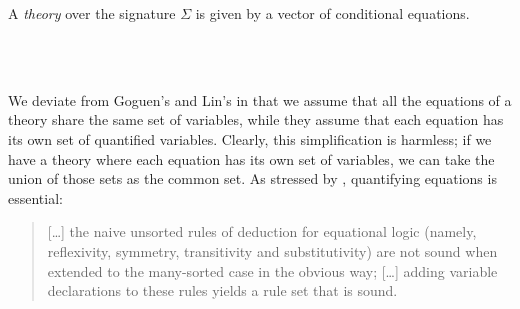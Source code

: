 \begin{code}
\>[0]\AgdaSpace{}%
\AgdaSpace{}%
\AgdaSymbol{(}\AgdaSpace{}%
\AgdaSymbol{:}\AgdaSpace{}%
\AgdaSpace{}%
\AgdaSymbol{)}\AgdaSpace{}%
\AgdaSymbol{(}\AgdaSpace{}%
\AgdaSymbol{:}\AgdaSpace{}%
\AgdaSpace{}%
\AgdaSymbol{)}\AgdaSpace{}%
\AgdaSymbol{:}\AgdaSpace{}%
\AgdaSpace{}%
\<%
\\
\>[0][@{}l@{\AgdaIndent{0}}]%
\>[2]\AgdaSpace{}%
\<%
\\
%
\>[2]\<%
\\
\>[2][@{}l@{\AgdaIndent{0}}]%
\>[4]%
\>[8]\AgdaSymbol{:}\AgdaSpace{}%
\AgdaSpace{}%
\AgdaSpace{}%
\<%
\\
%
\>[4]\AgdaSpace{}%
\AgdaSymbol{:}\AgdaSpace{}%
\AgdaSpace{}%
\AgdaSymbol{(}\AgdaSpace{}%
\AgdaSymbol{(}\AgdaSpace{}%
\AgdaSymbol{))}\<%
\\
%
\end{code}

\noindent A \emph{theory} over the signature $\Sigma$ is given by a
vector of conditional equations.
\begin{code}
  \>[0]\AgdaSpace{}%
\AgdaSymbol{:}\AgdaSpace{}%
\AgdaSymbol{(}\AgdaSpace{}%
\AgdaSymbol{:}\AgdaSpace{}%
\AgdaSpace{}%
\AgdaSymbol{)}\AgdaSpace{}%
\AgdaSpace{}%
\AgdaSymbol{(}\AgdaSpace{}%
\AgdaSymbol{:}\AgdaSpace{}%
\AgdaSpace{}%
\AgdaSymbol{)}\AgdaSpace{}%
\AgdaSpace{}%
\<%
\\
\>[0]\AgdaSpace{}%
\AgdaSpace{}%
\AgdaSpace{}%
\AgdaSymbol{=}\AgdaSpace{}%
\AgdaSpace{}%
\AgdaSymbol{(}\AgdaSpace{}%
\AgdaSymbol{)}\AgdaSpace{}%
\<%
\\
%
\end{code}

We deviate from Goguen's and Lin's in that we assume that all the
equations of a theory share the same set of variables, while they
assume that each equation has its own set of quantified
variables. Clearly, this simplification is harmless; if we have a
theory where each equation has its own set of variables, we can take
the union of those sets as the common set. As stressed by
\cite{goguen-remarks-87}, quantifying equations is essential:
\begin{quote}
  [\ldots] the naive unsorted rules of deduction for equational logic
  (namely, reflexivity, symmetry, transitivity and substitutivity) are
  not sound when extended to the many-sorted case in the obvious way;
  [\ldots] adding variable declarations to these rules
  yields a rule set that is sound.
\end{quote}

